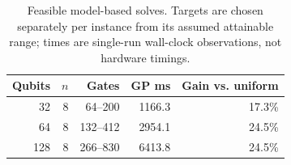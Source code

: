 \begin{table}[t]
\centering
\caption{Feasible model-based solves. Targets are chosen separately per instance from its assumed attainable range; times are single-run wall-clock observations, not hardware timings.}
\label{tab:feasible_scale}
\begin{tabular}{rrrrr}
\toprule
Qubits & $n$ & Gates & GP ms & Gain vs. uniform \\
\midrule
32 & 8 & 64--200 & 1166.3 & 17.3\% \\
64 & 8 & 132--412 & 2954.1 & 24.5\% \\
128 & 8 & 266--830 & 6413.8 & 24.5\% \\
\bottomrule
\end{tabular}
\end{table}
